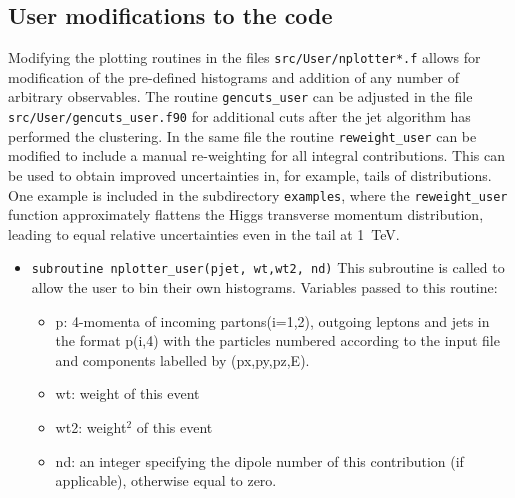 
\subsection{User modifications to the code}


Modifying the plotting routines in the files \texttt{src/User/nplotter*.f} allows for modification of the pre-defined 
histograms and addition of any number of arbitrary observables. The routine \texttt{gencuts\_user} can be adjusted  in 
the file
\texttt{src/User/gencuts\_user.f90} for additional cuts after the jet algorithm has performed the 
clustering. In the same file the routine \texttt{reweight\_user} can be modified to include a manual re-weighting
for all integral contributions. This can be used to obtain improved uncertainties in, for example, tails of 
distributions.
One example is included in the subdirectory \texttt{examples}, where the \texttt{reweight\_user} function approximately
flattens the Higgs transverse momentum distribution, leading to equal relative uncertainties even in the tail at 
\SI{1}{TeV}.

\label{user}
\begin{itemize}
	\item {\tt subroutine nplotter\_user(pjet, wt,wt2, nd)}
	This subroutine is called to allow the user to bin their own       
	histograms. Variables passed to this routine:
	
	\begin{itemize}
		\item        p:  4-momenta of incoming partons(i=1,2), outgoing leptons 
		and                                                             
		jets in the format p(i,4) with the particles 
		numbered                                                                  
		according to the input file and components labelled 
		by                                                                 
		(px,py,pz,E).  
		
		
		\item        wt:  weight of this 
		event                                                                                                   
		
		
		\item       wt2:  weight$^2$ of this 
		event                                                                                                 
		
		
		\item        nd:  an integer specifying the dipole number of this 
		contribution                                                           
		(if applicable), otherwise equal to zero.
	\end{itemize}
	
\end{itemize}
